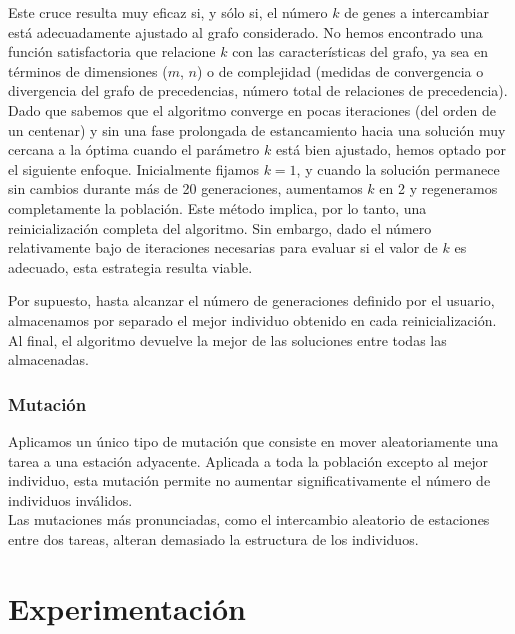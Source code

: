 \documentclass[12pt,a4paper]{report}
\begin{document}
Este cruce resulta muy eficaz si, y sólo si, el número \(k\) de genes a intercambiar está adecuadamente ajustado al grafo considerado. No hemos encontrado una función satisfactoria que relacione \(k\) con las características del grafo, ya sea en términos de dimensiones (\(m\), \(n\)) o de complejidad (medidas de convergencia o divergencia del grafo de precedencias, número total de relaciones de precedencia).\\
Dado que sabemos que el algoritmo converge en pocas iteraciones (del orden de un centenar) y sin una fase prolongada de estancamiento hacia una solución muy cercana a la óptima cuando el parámetro \(k\) está bien ajustado, hemos optado por el siguiente enfoque. Inicialmente fijamos \(k = 1\), y cuando la solución permanece sin cambios durante más de 20 generaciones, aumentamos \(k\) en 2 y regeneramos completamente la población. Este método implica, por lo tanto, una reinicialización completa del algoritmo. Sin embargo, dado el número relativamente bajo de iteraciones necesarias para evaluar si el valor de \(k\) es adecuado, esta estrategia resulta  viable.

Por supuesto, hasta alcanzar el número de generaciones definido por el usuario, almacenamos por separado el mejor individuo obtenido en cada reinicialización. Al final, el algoritmo devuelve la mejor de las soluciones entre todas las almacenadas.


\subsection{Mutación}

Aplicamos un único tipo de mutación que consiste en mover aleatoriamente una tarea a una estación adyacente. Aplicada a toda la población excepto al mejor individuo, esta mutación permite no aumentar significativamente el número de individuos inválidos.\\
Las mutaciones más pronunciadas, como el intercambio aleatorio de estaciones entre dos tareas, alteran demasiado la estructura de los individuos.
\chapter{Experimentación}
\end{document}
